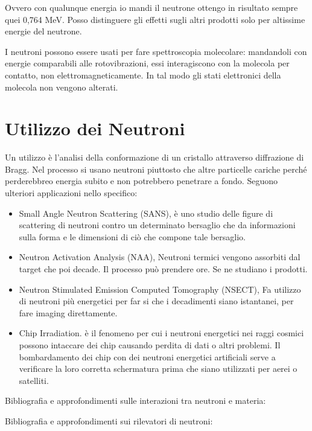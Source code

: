 Ovvero con qualunque energia io mandi il neutrone ottengo in risultato sempre quei 0,764 MeV. Posso distinguere gli effetti sugli altri prodotti solo per altissime energie del neutrone.

I neutroni possono essere usati per fare spettroscopia molecolare: mandandoli con energie comparabili alle rotovibrazioni, essi interagiscono con la molecola per contatto, non elettromagneticamente. In tal modo gli stati elettronici della molecola non vengono alterati. 

\section{Utilizzo dei Neutroni}

Un utilizzo è l'analisi della conformazione di un cristallo attraverso diffrazione di Bragg. Nel processo si usano neutroni piuttosto che altre particelle cariche perché perderebbreo energia subito e non potrebbero penetrare a fondo. 
Seguono ulteriori applicazioni nello specifico:

\begin{itemize}
\item Small Angle Neutron Scattering (SANS), è uno studio delle figure di scattering di neutroni contro un determinato bersaglio che da informazioni sulla forma e le dimensioni di ciò che compone tale bersaglio.
\item Neutron Activation Analysis (NAA), Neutroni termici vengono assorbiti dal target che poi decade. Il processo può prendere ore. Se ne studiano i prodotti.
\item Neutron Stimulated Emission Computed Tomography (NSECT), Fa utilizzo di neutroni più energetici per far si che i decadimenti siano istantanei, per fare imaging direttamente.
\item Chip Irradiation. è il fenomeno per cui i neutroni energetici nei raggi cosmici possono intaccare dei chip causando perdita di dati o altri problemi. Il bombardamento dei chip con dei neutroni energetici artificiali serve a verificare la loro corretta schermatura 
prima che siano utilizzati per aerei o satelliti.
\end{itemize}

Bibliografia e approfondimenti sulle interazioni tra neutroni e materia: \cite{Corvisiero} \cite{Assay}

Bibliografia e approfondimenti sui rilevatori di neutroni: \cite{Beringer2} \cite{Knoll}

